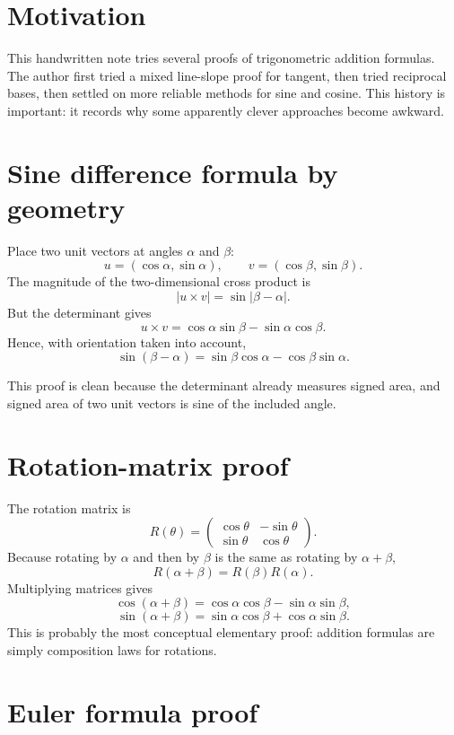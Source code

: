 
\section{Motivation}

This handwritten note tries several proofs of trigonometric addition formulas.  The author first tried a mixed line-slope proof for tangent, then tried reciprocal bases, then settled on more reliable methods for sine and cosine.  This history is important: it records why some apparently clever approaches become awkward.

\section{Sine difference formula by geometry}

Place two unit vectors at angles \(\alpha\) and \(\beta\):
\[
  u=(\cos\alpha,\sin\alpha),\qquad v=(\cos\beta,\sin\beta).
\]
The magnitude of the two-dimensional cross product is
\[
  |u\times v|=\sin|\beta-\alpha|.
\]
But the determinant gives
\[
  u\times v=\cos\alpha\sin\beta-\sin\alpha\cos\beta.
\]
Hence, with orientation taken into account,
\[
  \sin(\beta-\alpha)=\sin\beta\cos\alpha-\cos\beta\sin\alpha.
\]

This proof is clean because the determinant already measures signed area, and signed area of two unit vectors is sine of the included angle.

\section{Rotation-matrix proof}

The rotation matrix is
\[
  R(\theta)=
  \begin{pmatrix}
  \cos\theta&-\sin\theta\\
  \sin\theta&\cos\theta
  \end{pmatrix}.
\]
Because rotating by \(\alpha\) and then by \(\beta\) is the same as rotating by \(\alpha+\beta\),
\[
  R(\alpha+\beta)=R(\beta)R(\alpha).
\]
Multiplying matrices gives
\[
  \cos(\alpha+\beta)=\cos\alpha\cos\beta-\sin\alpha\sin\beta,
\]
\[
  \sin(\alpha+\beta)=\sin\alpha\cos\beta+\cos\alpha\sin\beta.
\]
This is probably the most conceptual elementary proof: addition formulas are simply composition laws for rotations.

\section{Euler formula proof}

